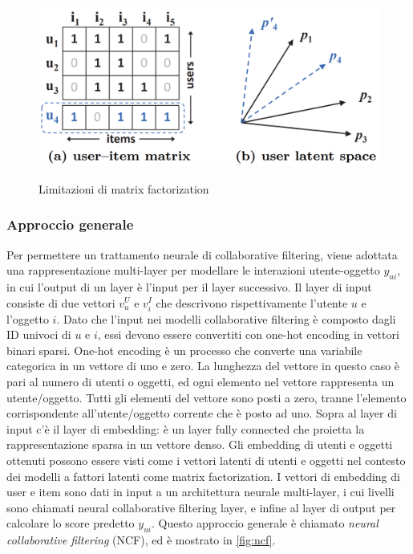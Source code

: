 \begin{figure}
  \centering
  \includegraphics[scale=0.50]{immagini/user_item_vectors.png}
  \caption{Limitazioni di matrix factorization}
  \cite{NCF}
  \label{fig:mf-limits}
\end{figure}

\subsubsection{Approccio generale}
Per permettere un trattamento neurale di collaborative filtering, viene adottata una rappresentazione multi-layer per modellare le interazioni utente-oggetto $y_{ui}$, in cui l'output di un layer è l'input per il layer successivo. Il layer di input consiste di due vettori $v_u^U$ e $v_i^I$ che descrivono rispettivamente l'utente $u$ e l'oggetto $i$. Dato che l'input nei modelli collaborative filtering è composto dagli ID univoci di $u$ e $i$, essi devono essere convertiti con one-hot encoding in vettori binari sparsi. One-hot encoding è un processo che converte una variabile categorica in un vettore di uno e zero. La lunghezza del vettore in questo caso è pari al numero di utenti o oggetti, ed ogni elemento nel vettore rappresenta un utente/oggetto. Tutti gli elementi del vettore sono posti a zero, tranne l'elemento corrispondente all'utente/oggetto corrente che è posto ad uno. Sopra al layer di input c'è il layer di embedding: è un layer fully connected che proietta la rappresentazione sparsa in un vettore denso. Gli embedding di utenti e oggetti ottenuti possono essere visti come i vettori latenti di utenti e oggetti nel contesto dei modelli a fattori latenti come matrix factorization. I vettori di embedding di user e item sono dati in input a un architettura neurale multi-layer, i cui livelli sono chiamati neural collaborative filtering layer, e infine al layer di output per calcolare lo score predetto $y_{ui}$. Questo approccio generale è chiamato \textit{neural collaborative filtering} (NCF), ed è mostrato in \autoref{fig:ncf}.

